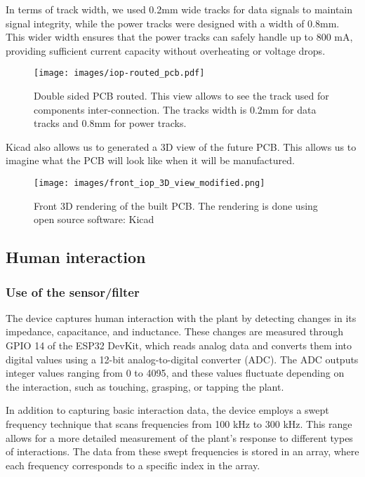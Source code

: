 In terms of track width, we used 0.2mm wide tracks for data signals to maintain signal integrity, while the power tracks were designed with a width of 0.8mm. This wider width ensures that the power tracks can safely handle up to 800 mA, providing sufficient current capacity without overheating or voltage drops.

\begin{figure}[H]
    \centering
    \texttt{[image: images/iop-routed\_pcb.pdf]}
    \caption{Double sided PCB routed. This view allows to see the track used for components inter-connection. The tracks width is 0.2mm for data tracks and 0.8mm for power tracks.}
    \vspace{0.1cm}
    \label{fig:iop_routed_pcb}
\end{figure}

Kicad also allows us to generated a 3D view of the future PCB. This allows us to imagine what the
PCB will look like when it will be manufactured.
\begin{figure}[H]
    \centering
    \texttt{[image: images/front\_iop\_3D\_view\_modified.png]}
    \caption{Front 3D rendering of the built PCB. The rendering is done using open source software: Kicad}
    \vspace{0.1cm}
    \label{fig:front_iop_3D_view_modified}
\end{figure}

\subsection{Human interaction}

\subsubsection{Use of the sensor/filter}

The device captures human interaction with the plant by detecting changes in its impedance, capacitance, and inductance. These changes are measured through GPIO 14 of the ESP32 DevKit, which reads analog data and converts them into digital values using a 12-bit analog-to-digital converter (ADC). The ADC outputs integer values ranging from 0 to 4095, and these values fluctuate depending on the interaction, such as touching, grasping, or tapping the plant.

In addition to capturing basic interaction data, the device employs a swept frequency technique that scans frequencies from 100 kHz to 300 kHz. This range allows for a more detailed measurement of the plant’s response to different types of interactions. The data from these swept frequencies is stored in an array, where each frequency corresponds to a specific index in the array.

